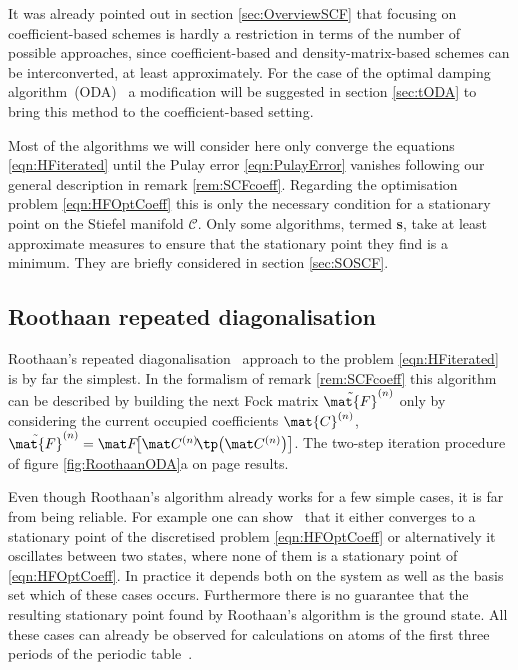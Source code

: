 It was already pointed out in section \vref{sec:OverviewSCF}
that focusing on coefficient-based schemes
is hardly a restriction in terms of the number of possible approaches,
since coefficient-based and density-matrix-based schemes can be interconverted,
at least approximately.
For the case of the optimal damping algorithm~(ODA)~\cite{Cances2000a}
a modification will be suggested
in section \ref{sec:tODA}
to bring this method to the coefficient-based setting.

Most of the \SCF algorithms we will consider here
only converge the \HF equations \eqref{eqn:HFiterated}
until the Pulay error \eqref{eqn:PulayError} vanishes
following our general description in remark \vref{rem:SCFcoeff}.
Regarding the \HF optimisation problem \eqref{eqn:HFOptCoeff}
this is only the necessary condition for a stationary point on the Stiefel
manifold $\mathcal{C}$.
Only some \SCF algorithms,
termed \textbf{s},
take at least approximate measures
to ensure that the stationary point they find is a minimum.
They are briefly considered in section \ref{sec:SOSCF}.

\subsection{Roothaan repeated diagonalisation}
\label{sec:RoothaanRepeatedDiag}

Roothaan's repeated diagonalisation~\cite{Roothaan1951}
approach to the \HF problem \eqref{eqn:HFiterated} is by far the simplest.
In the formalism of remark \vref{rem:SCFcoeff}
this algorithm can be described by building the next Fock matrix
$\tilde{\mat{F}}^{(n)}$ only by considering
the current occupied coefficients $\mat{C}^{(n)}$,
\ie $\tilde{\mat{F}}^{(n)} = \matFnfull$.
The two-step iteration procedure of figure \ref{fig:RoothaanODA}a
on page \pageref{fig:RoothaanODA}results.

Even though Roothaan's algorithm already works for a few simple cases,
it is far from being reliable.
For example one can show~\cite{Cances2000,Cances2000b} that it
either converges to a stationary point of the
discretised \HF problem \eqref{eqn:HFOptCoeff}
or alternatively it oscillates between two states,
where none of them is a stationary point of \eqref{eqn:HFOptCoeff}.
In practice it depends both on the system
as well as the basis set which of these cases occurs.
Furthermore there is no guarantee that the resulting stationary point found by
Roothaan's algorithm is the \HF ground state.
All these cases can already be observed for \HF calculations
on atoms of the first three periods of the periodic table~\cite{Cances2000}.

